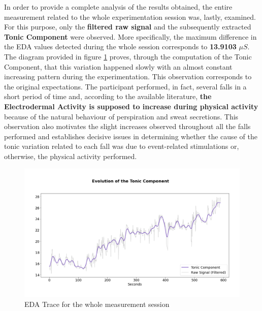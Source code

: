 In order to provide a complete analysis of the results obtained, the entire measurement related to the whole experimentation session was, lastly, examined. For this purpose, only the \textbf{filtered raw signal} and the subsequently extracted \textbf{Tonic Component} were observed. More specifically, the maximum difference in the EDA values detected during the whole session corresponds to \textbf{13.9103} $\mu S$. The diagram provided in figure \ref{fig:movisens-global} proves, through the computation of the Tonic Component, that this variation happened slowly with an almost constant increasing pattern during the experimentation. This observation corresponds to the original expectations. The participant performed, in fact, several falls in a short period of time and, according to the available literature, \textbf{the Electrodermal Activity is supposed to increase during physical activity} \cite{eda-interval-4} because of the natural behaviour of perspiration and sweat secretions. This observation also motivates the slight increases observed throughout all the falls performed and establishes decisive issues in determining whether the cause of the tonic variation related to each fall was due to event-related stimulations or, otherwise, the physical activity performed.


\begin{figure}[h]
    \centering
    \includegraphics[width=\textwidth]{./images/movisens/Global.png}
    \caption{EDA Trace for the whole measurement session}
    \label{fig:movisens-global}
\end{figure}
